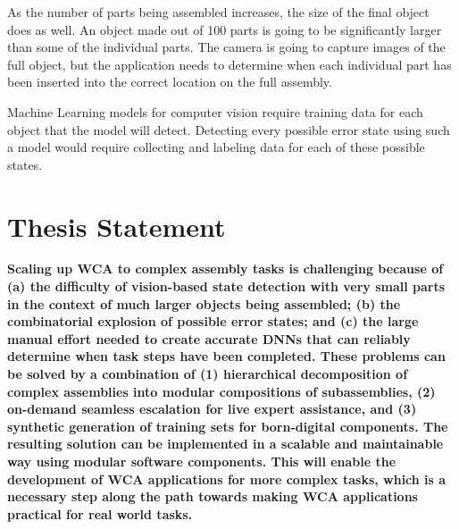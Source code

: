 As the number of parts being assembled increases, the size of the final object
does as well. An object made out of 100 parts is going to be significantly
larger than some of the individual parts. The camera is going to capture images
of the full object, but the application needs to determine when each individual
part has been inserted into the correct location on the full assembly.

Machine Learning models for computer vision require training data for each
object that the model will detect. Detecting every possible error state using
such a model would require collecting and labeling data for each of these
possible states.

\section{Thesis Statement}

\textbf{
  Scaling up WCA to complex assembly tasks is challenging because of
  (a) the difficulty of
  vision-based state detection with very small parts in the context of much
  larger objects being assembled; (b) the combinatorial explosion
  of possible error states; and (c) the large manual effort needed to create
  accurate DNNs that can reliably determine when task steps have been completed.
  These problems can be solved by a combination of (1) hierarchical
  decomposition of
  complex assemblies into modular compositions of subassemblies, (2) on-demand
  seamless
  escalation for live expert assistance, and (3) synthetic generation of
  training
  sets for born-digital components. The resulting solution can be implemented in
  a scalable and maintainable way using modular software components.
  This will enable the development of WCA applications for more complex tasks,
  which is a necessary step along the path towards making WCA applications
  practical for real world tasks.
}
